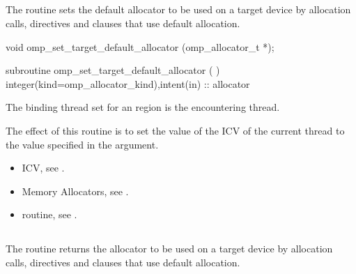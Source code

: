 \ccppspecificstart

\subsection{}
\label{subsec:omp_set_target_default_allocator}

\summary
The  routine sets the default allocator to be used on a target device by allocation calls, directives and clauses that use default allocation.

\format
\ccppspecificstart
\begin{boxedcode}
void omp_set_target_default_allocator (omp_allocator_t *);
\end{boxedcode}
\ccppspecificend
\fortranspecificstart
\begin{boxedcode}
subroutine omp_set_target_default_allocator (  )
integer(kind=omp_allocator_kind),intent(in) :: allocator
\end{boxedcode}
\fortranspecificend
\binding
The binding thread set for an  region is the encountering thread.

\effect

The effect of this routine is to set the value of the  ICV of the current thread to the value specified in the  argument. 

\crossreferences

\begin{itemize}
\item {} ICV, see .
\item Memory Allocators, see .
\item {} routine, see .
\end{itemize}

\subsection{}
\label{subsec:omp_get_target_default_allocator}

\summary
The  routine returns the allocator to be used on a target device by allocation calls, directives and clauses that use default allocation.

